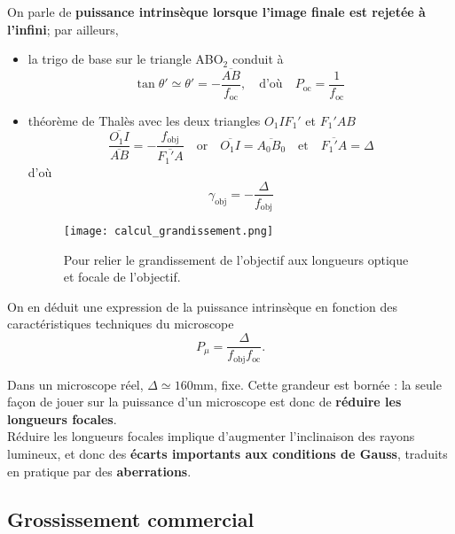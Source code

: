 \documentclass[11pt,a4paper]{report}
\begin{document}
On parle de \textbf{puissance intrinsèque lorsque l'image finale est rejetée à l'infini}; par ailleurs, 
\begin{itemize}
	\item la trigo de base sur le triangle AB$\text{O}_2$ conduit à
	\begin{equation}
	\text{tan}\;\theta' \simeq \theta' = -\frac{\overline{AB}}{f_\text{oc}},\quad\text{d'où}\quad
	\boxed{P_\text{oc} = \frac{1}{f_\text{oc}}}
	\end{equation}

	\item théorème de Thalès avec les deux triangles $O_1IF_1'$ et $F_1'AB$ 
	\begin{equation}
		\frac{\overline{O_1I}}{\overline{AB}} = -\frac{f_\text{obj}}{\overline{F_1'A}} 
		\quad\text{or}\quad \overline{O_1I} = \overline{A_0B_0} \quad\text{et}\quad
		\overline{F_1'A} = \Delta
	\end{equation}
	d'où
	\begin{equation}
		\boxed{\gamma_\text{obj} = -\frac{\Delta}{f_\text{obj}}}
	\end{equation}
	\begin{figure}[h!]
	\begin{center}
   		\texttt{[image: calcul\_grandissement.png]}\\
	\end{center}
	\caption{Pour relier le grandissement de l'objectif aux longueurs optique et focale de 					l'objectif.}
\end{figure}
\end{itemize}


On en déduit une expression de la puissance intrinsèque en fonction des caractéristiques techniques du microscope
\begin{equation}
	\boxed{P_\mu = \frac{\Delta}{f_\text{obj}f_\text{oc}}.}
\end{equation}

Dans un microscope réel, $\Delta \simeq 160$mm, fixe. Cette grandeur est bornée : la seule façon de jouer sur la puissance d'un microscope est donc de \textbf{réduire les longueurs focales}.\\

Réduire les longueurs focales implique d'augmenter l'inclinaison des rayons lumineux, et donc des \textbf{écarts importants aux conditions de Gauss}, traduits en pratique par des \textbf{aberrations}.

\subsection{Grossissement commercial}
\end{document}
